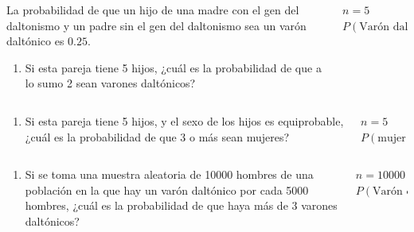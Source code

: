 \documentclass[aspectratio=169,10pt,t]{beamer}
\begin{document}
\begin{frame}
\begin{columns}
\begin{column}[T]{0.7\textwidth}
La probabilidad de que un hijo de una madre con el gen del daltonismo y un padre sin el gen del daltonismo sea un varón daltónico es $0.25$.
\begin{enumerate}
\item Si esta pareja tiene 5 hijos, ¿cuál es la probabilidad de que a lo sumo 2 sean varones daltónicos?
\end{enumerate}
\end{column}
\quad
\begin{column}[T]{0.3\textwidth}
\begin{datos}
$n = 5$\\
$P(\mbox{Varón daltónico})=0.25$
\end{datos}
\end{column}
\end{columns}
\end{frame}


\begin{frame}
\begin{columns}
\begin{column}[T]{0.7\textwidth}
\begin{enumerate}
\item[2.] Si esta pareja tiene 5 hijos, y el sexo de los hijos es equiprobable, ¿cuál es la probabilidad de que 3 o más sean mujeres?
\end{enumerate}
\end{column}
\begin{column}[T]{0.3\textwidth}
\begin{datos}
$n=5$\\
$P(\mbox{mujer})=0.5$
\end{datos}
\end{column}
\end{columns}
\end{frame}

\begin{frame}
\begin{columns}
\begin{column}[T]{0.7\textwidth}
\begin{enumerate}
\item[3.] Si se toma una muestra aleatoria de 10000 hombres de una población en la que hay un varón daltónico por cada 5000 hombres, ¿cuál es la probabilidad de que haya más de 3 varones daltónicos?
\end{enumerate}
\end{column}
\begin{column}[T]{0.32\textwidth}
\begin{datos}
$n=10000$\\
$P(\mbox{Varón daltónico})=0.0002$
\end{datos}
\end{column}
\end{columns}
\end{frame}
\end{document}
